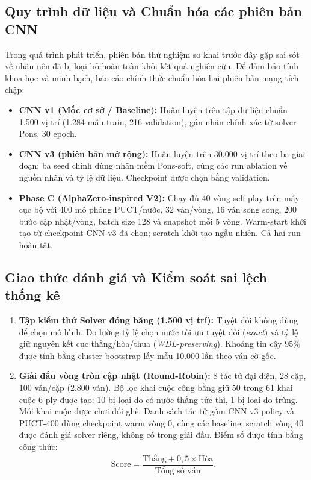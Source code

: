 \documentclass[11pt, a4paper]{article}
\begin{document}
\subsection{Quy trình dữ liệu và Chuẩn hóa các phiên bản CNN}
Trong quá trình phát triển, phiên bản thử nghiệm sơ khai trước đây gặp sai sót về nhãn nên đã bị loại bỏ hoàn toàn khỏi kết quả nghiên cứu. Để đảm bảo tính khoa học và minh bạch, báo cáo chính thức chuẩn hóa hai phiên bản mạng tích chập:
\begin{itemize}
    \item \textbf{CNN v1 (Mốc cơ sở / Baseline):} Huấn luyện trên tập dữ liệu chuẩn 1.500 vị trí (1.284 mẫu train, 216 validation), gán nhãn chính xác từ solver Pons, 30 epoch.
    \item \textbf{CNN v3 (phiên bản mở rộng):} Huấn luyện trên 30.000 vị trí theo ba giai đoạn; ba seed chính dùng nhãn mềm Pons-soft, cùng các run ablation về nguồn nhãn và tỷ lệ dữ liệu. Checkpoint được chọn bằng validation.
    \item \textbf{Phase C (AlphaZero-inspired V2):} Chạy đủ 40 vòng self-play trên máy cục bộ với 400 mô phỏng PUCT/nước, 32 ván/vòng, 16 ván song song, 200 bước cập nhật/vòng, batch size 128 và snapshot mỗi 5 vòng. Warm-start khởi tạo từ checkpoint CNN v3 đã chọn; scratch khởi tạo ngẫu nhiên. Cả hai run hoàn tất.
\end{itemize}

\subsection{Giao thức đánh giá và Kiểm soát sai lệch thống kê}
\begin{enumerate}
    \item \textbf{Tập kiểm thử Solver đóng băng (1.500 vị trí):} Tuyệt đối không dùng để chọn mô hình. Đo lường tỷ lệ chọn nước tối ưu tuyệt đối (\textit{exact}) và tỷ lệ giữ nguyên kết cục thắng/hòa/thua (\textit{WDL-preserving}). Khoảng tin cậy 95\% được tính bằng cluster bootstrap lấy mẫu 10.000 lần theo ván cờ gốc.
    \item \textbf{Giải đấu vòng tròn cập nhật (Round-Robin):} 8 tác tử đại diện, 28 cặp, 100 ván/cặp (2.800 ván). Bộ lọc khai cuộc công bằng giữ 50 trong 61 khai cuộc 6 ply được tạo: 10 bị loại do có nước thắng tức thì, 1 bị loại do trùng. Mỗi khai cuộc được chơi đổi ghế. Danh sách tác tử gồm CNN v3 policy và PUCT-400 dùng checkpoint warm vòng 0, cùng các baseline; scratch vòng 40 được đánh giá solver riêng, không có trong giải đấu. Điểm số được tính bằng công thức:
    \begin{equation}
    \text{Score} = \frac{\text{Thắng} + 0{,}5 \times \text{Hòa}}{\text{Tổng số ván}}.
    \end{equation}
\end{enumerate}
\end{document}
